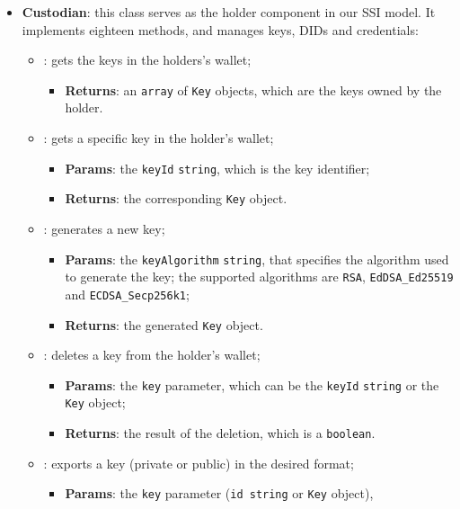 \begin{itemize}
    \item \textbf{Custodian}: this class serves as the holder component in our
    SSI model. It implements eighteen methods, and manages keys, DIDs and credentials:
    \begin{itemize}
        \setlength{\itemsep}{0.4cm}
        \item[] : gets the keys in the holders's wallet;
        \begin{itemize}
            \item \textbf{Returns}: an \texttt{array} of \texttt{Key} objects, which are the keys
            owned by the holder.
        \end{itemize}
        \item[] : gets a specific key in the holder's wallet;
        \begin{itemize}
            \item \textbf{Params}: the \texttt{keyId} \texttt{string}, which is the key identifier;
            \item \textbf{Returns}: the corresponding \texttt{Key} object.
        \end{itemize}
        \item[] : generates a new key;
        \begin{itemize}
            \item \textbf{Params}: the \texttt{keyAlgorithm} \texttt{string}, that specifies
            the algorithm used to generate the key; the supported algorithms are 
            \texttt{RSA}, \texttt{EdDSA\_Ed25519} and \texttt{ECDSA\_Secp256k1};
            \item \textbf{Returns}: the generated \texttt{Key} object.
        \end{itemize}
        \item[] : deletes a key from the holder's wallet;
        \begin{itemize}
            \item \textbf{Params}: the \texttt{key} parameter, which can be the \texttt{keyId}
            \texttt{string} or the \texttt{Key} object;
            \item \textbf{Returns}: the result of the deletion, which is a \texttt{boolean}.
        \end{itemize}
        \item[] : exports a key (private or public) in the desired format;
        \begin{itemize}
            \item \textbf{Params}: the \texttt{key} parameter (\texttt{id string} or \texttt{Key} object),

\end{itemize}
\end{itemize}
\end{itemize}
